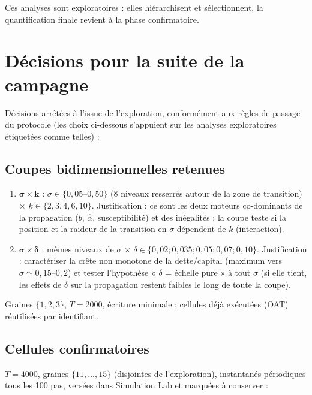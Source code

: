 \documentclass[11pt,a4paper]{article}
\begin{document}
Ces analyses sont exploratoires : elles hiérarchisent et sélectionnent,
la quantification finale revient à la phase confirmatoire.

\section{Décisions pour la suite de la campagne}
\label{sec:decisions}

Décisions arrêtées à l'issue de l'exploration, conformément aux règles
de passage du protocole (les choix ci-dessous s'appuient sur les
analyses exploratoires étiquetées comme telles) :

\subsection{Coupes bidimensionnelles retenues}

\begin{enumerate}
\item $\boldsymbol{\sigma\times k}$ : $\sigma\in\{0{,}05$--$0{,}50\}$
  (8 niveaux resserrés autour de la zone de transition) $\times$
  $k\in\{2,3,4,6,10\}$. Justification : ce sont les deux moteurs
  co-dominants de la propagation ($b$, $\hat\alpha$, susceptibilité) et
  des inégalités ; la coupe teste si la position et la raideur de la
  transition en $\sigma$ dépendent de $k$ (interaction).
\item $\boldsymbol{\sigma\times\delta}$ : mêmes niveaux de $\sigma$
  $\times$ $\delta\in\{0{,}02;0{,}035;0{,}05;0{,}07;0{,}10\}$.
  Justification : caractériser la crête non monotone de la
  dette/capital (maximum vers $\sigma\simeq0{,}15$--$0{,}2$) et tester
  l'hypothèse « $\delta$ = échelle pure » à tout $\sigma$ (si elle
  tient, les effets de $\delta$ sur la propagation restent faibles le
  long de toute la coupe).
\end{enumerate}

Graines $\{1,2,3\}$, $T=2000$, écriture minimale ; cellules déjà
exécutées (OAT) réutilisées par identifiant.

\subsection{Cellules confirmatoires}

$T=4000$, graines $\{11,\dots,15\}$ (disjointes de l'exploration),
instantanés périodiques tous les 100 pas, versées dans Simulation Lab et
marquées à conserver :
\end{document}
